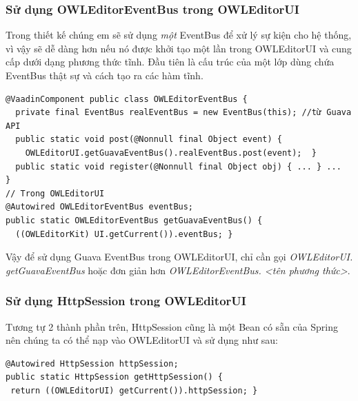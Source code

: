 \subsubsection{Sử dụng OWLEditorEventBus trong OWLEditorUI}
Trong thiết kế chúng em sẽ sử dụng \textit{một} EventBus để xử lý sự kiện cho hệ thống, vì vậy sẽ dễ dàng hơn nếu nó được khởi tạo một lần trong OWLEditorUI và cung cấp dưới dạng phương thức tĩnh. Đầu tiên là cấu trúc của một lớp dùng chứa EventBus thật sự và cách tạo ra các hàm tĩnh.
\begin{verbatim}
@VaadinComponent public class OWLEditorEventBus {
  private final EventBus realEventBus = new EventBus(this); //từ Guava API
  public static void post(@Nonnull final Object event) {
    OWLEditorUI.getGuavaEventBus().realEventBus.post(event);  }
  public static void register(@Nonnull final Object obj) { ... } ...
}
// Trong OWLEditorUI
@Autowired OWLEditorEventBus eventBus;
public static OWLEditorEventBus getGuavaEventBus() {
  ((OWLEditorKit) UI.getCurrent()).eventBus; }
\end{verbatim}
Vậy để sử dụng Guava EventBus trong OWLEditorUI, chỉ cần gọi \textit{OWLEditorUI. getGuavaEventBus} hoặc đơn giản hơn \textit{OWLEditorEventBus. <tên phương thức>}.
\subsubsection{Sử dụng HttpSession trong OWLEditorUI}
Tương tự 2 thành phần trên, HttpSession cũng là một Bean có sẵn của Spring nên chúng ta có thể nạp vào OWLEditorUI và sử dụng như sau:
\begin{verbatim}
@Autowired HttpSession httpSession;
public static HttpSession getHttpSession() {
 return ((OWLEditorUI) getCurrent()).httpSession; }
\end{verbatim}
